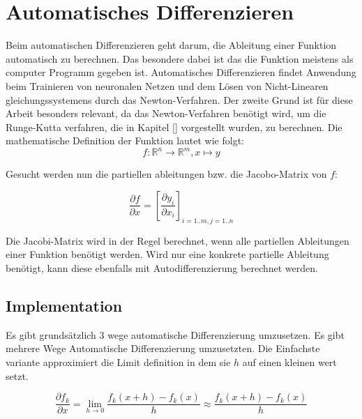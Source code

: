
\section{Automatisches Differenzieren} \label{sec:auto_diffentiation}

Beim automatischen Differenzieren geht darum, die Ableitung einer Funktion automatisch zu berechnen.
Das besondere dabei ist das die Funktion meistens als computer Programm gegeben ist.
Automatisches Differenzieren findet Anwendung beim Trainieren von neuronalen Netzen und dem Lösen von Nicht-Linearen gleichungssystemens durch das Newton-Verfahren.
Der zweite Grund ist für diese Arbeit besonders relevant, da 
das Newton-Verfahren benötigt wird, um die Runge-Kutta verfahren, die in Kapitel \ref{} vorgestellt wurden, zu berechnen.
Die mathematische Definition der Funktion lautet wie folgt:
$$
f: \mathbb{R}^n \rightarrow \mathbb{R}^m, x \mapsto y
$$

Gesucht werden nun die partiellen ableitungen bzw. die Jacobo-Matrix von $f$:

$$
\frac{\partial f}{\partial x} = \left[ \frac{\partial y_i}{\partial x_i} \right]_{i=1..m, j=1..n} 
$$

Die Jacobi-Matrix wird in der Regel berechnet, wenn alle partiellen Ableitungen einer Funktion benötigt werden.
Wird nur eine konkrete partielle Ableitung benötigt, kann diese ebenfalls mit Autodifferenzierung berechnet werden.

\subsection{Implementation} \label{sec:implementation}

Es gibt grundsätzlich 3 wege automatische Differenzierung umzusetzen.
Es gibt mehrere Wege Automatische Differenzierung umzusetzten.
Die Einfachste variante approximiert die Limit definition in dem sie $h$ auf einen kleinen wert setzt.

$$
\frac{\partial f_k}{\partial x} = \lim_{h \to 0} \frac{f_k(x+ h) - f_k(x)}{h} \approx \frac{f_k(x + h) - f_k(x)}{h} 
$$


